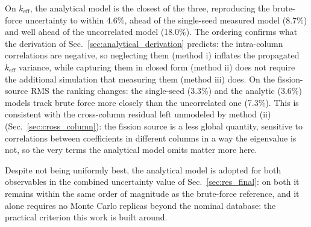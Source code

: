 \documentclass{style/nseJournal}
\begin{document}
On $k_{\text{eff}}$, the analytical model is the closest of the three, reproducing the brute-force uncertainty to within 4.6\%, ahead of the single-seed measured model (8.7\%) and well ahead of the uncorrelated model (18.0\%). The ordering confirms what the derivation of Sec.~\ref{sec:analytical_derivation} predicts: the intra-column correlations are negative, so neglecting them (method i) inflates the propagated $k_{\text{eff}}$ variance, while capturing them in closed form (method ii) does not require the additional simulation that measuring them (method iii) does. On the fission-source RMS the ranking changes: the single-seed (3.3\%) and the analytic (3.6\%) models track brute force more closely than the uncorrelated one (7.3\%). This is consistent with the cross-column residual left unmodeled by method (ii) (Sec.~\ref{sec:cross_column}): the fission source is a less global quantity, sensitive to correlations between coefficients in different columns in a way the eigenvalue is not, so the very terms the analytical model omits matter more here.

Despite not being uniformly best, the analytical model is adopted for both observables in the combined uncertainty value of Sec.~\ref{sec:res_final}: on both it remains within the same order of magnitude as the brute-force reference, and it alone requires no Monte Carlo replicas beyond the nominal database: the practical criterion this work is built around.





\end{document}
